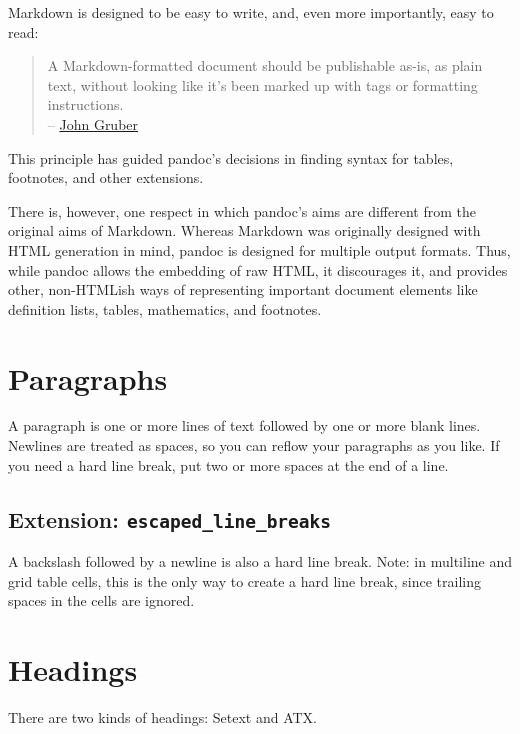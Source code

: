 \documentclass[
  b5paper
]{book}
\begin{document}
Markdown is designed to be easy to write, and, even more importantly,
easy to read:

\begin{quote}
A Markdown-formatted document should be publishable as-is, as plain
text, without looking like it's been marked up with tags or formatting
instructions.\\
--
\href{https://daringfireball.net/projects/markdown/syntax\#philosophy}{John
Gruber}
\end{quote}

This principle has guided pandoc's decisions in finding syntax for
tables, footnotes, and other extensions.

There is, however, one respect in which pandoc's aims are different from
the original aims of Markdown. Whereas Markdown was originally designed
with HTML generation in mind, pandoc is designed for multiple output
formats. Thus, while pandoc allows the embedding of raw HTML, it
discourages it, and provides other, non-HTMLish ways of representing
important document elements like definition lists, tables, mathematics,
and footnotes.

\section{Paragraphs}\label{paragraphs}

A paragraph is one or more lines of text followed by one or more blank
lines. Newlines are treated as spaces, so you can reflow your paragraphs
as you like. If you need a hard line break, put two or more spaces at
the end of a line.

\subsection{\texorpdfstring{Extension:
\texttt{escaped\_line\_breaks}}{Extension: escaped\_line\_breaks}}\label{extension-escaped_line_breaks}

A backslash followed by a newline is also a hard line break. Note: in
multiline and grid table cells, this is the only way to create a hard
line break, since trailing spaces in the cells are ignored.

\section{Headings}\label{headings}

There are two kinds of headings: Setext and ATX.
\end{document}
